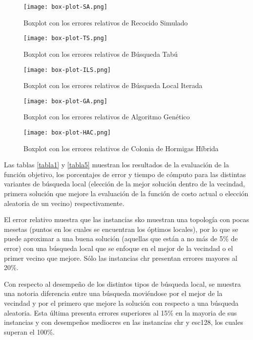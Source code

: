 \documentclass{ci5652}
\begin{document}
\begin{figure}
\caption{Boxplot con los errores relativos de Recocido Simulado}
\texttt{[image: box-plot-SA.png]}    
\label{fig1}
\end{figure}

\begin{figure}
\caption{Boxplot con los errores relativos de Búsqueda Tabú}
\texttt{[image: box-plot-TS.png]}    
\label{fig2}
\end{figure}

\begin{figure}
\caption{Boxplot con los errores relativos de Búsqueda Local Iterada}
\texttt{[image: box-plot-ILS.png]}    
\label{fig3}
\end{figure}

\begin{figure}
\caption{Boxplot con los errores relativos de Algoritmo Genético}
\texttt{[image: box-plot-GA.png]}    
\label{fig4}
\end{figure}

\begin{figure}
\caption{Boxplot con los errores relativos de Colonia de Hormigas Híbrida}
\texttt{[image: box-plot-HAC.png]}    
\label{fig5}
\end{figure}

Las tablas \ref{tabla1} y \ref{tabla5} muestran los resultados de la evaluación de la función objetivo, los porcentajes de error y tiempo de cómputo para las distintas variantes de búsqueda local (elección de la mejor solución dentro de la vecindad, primera solución que mejore la evaluación de la función de costo actual o elección aleatoria de un vecino) respectivamente.

El error relativo muestra que las instancias sko muestran una topología con pocas mesetas (puntos en los cuales se encuentran los óptimos locales), por lo que se puede aproximar a una buena solución (aquellas que están a no más de 5\% de error) con una búsqueda local que se enfoque en el mejor de la vecindad o el primer vecino que mejore. Sólo las instancias chr presentan errores mayores al 20\%.

Con respecto al desempeño de los distintos tipos de búsqueda local, se muestra una notoria diferencia entre una búsqueda moviéndose por el mejor de la vecindad y por el primero que mejore la solución con respecto a una búsqueda aleatoria. Esta última presenta errores superiores al 15\% en la mayoria de sus instancias y con desempeños mediocres en las instancias chr y esc128, los cuales superan el 100\%.
\end{document}
